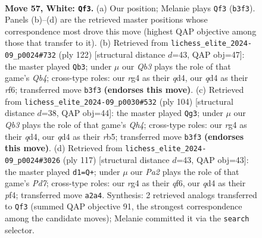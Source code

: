\documentclass[11pt]{article}
\begin{document}
\clearpage

\begin{figure}[p]\centering
\begin{subfigure}{0.46\textwidth}\centering
\resizebox{\linewidth}{!}{%
\newchessgame
\chessboard[
  setfen={8/8/5pk1/3p4/3q2r1/1Q4P1/P5KP/8 w - - 8 57},
  showmover=false,
  pgfstyle=straightmove, color=movearrow, markmove={b3-f3}
]}
\caption{}
\end{subfigure}\hfill
\begin{subfigure}{0.46\textwidth}\centering
\resizebox{\linewidth}{!}{%
\newchessgame
\chessboard[
  setfen={8/4R3/2p2r1k/8/1QPq3p/P7/KP6/8 w - - 4 62},
  showmover=false,
  pgfstyle=straightmove, color=movearrow, markmove={b4-b3}
]}
\caption{}
\end{subfigure}
\\[4pt]
\begin{subfigure}{0.46\textwidth}\centering
\resizebox{\linewidth}{!}{%
\newchessgame
\chessboard[
  setfen={8/3k1p2/5p2/1r6/3q1P1Q/Rp5P/6PK/8 w - - 2 53},
  showmover=false,
  pgfstyle=straightmove, color=movearrow, markmove={h4-g3}
]}
\caption{}
\end{subfigure}\hfill
\begin{subfigure}{0.46\textwidth}\centering
\resizebox{\linewidth}{!}{%
\newchessgame
\chessboard[
  setfen={8/6P1/3kpQ2/7K/5P2/1p6/1P1p4/4q3 b - - 2 59},
  showmover=false,
  pgfstyle=straightmove, color=movearrow, markmove={d2-d1}
]}
\caption{}
\end{subfigure}
\caption{\textbf{Move 57, White: \texttt{Qf3}.} (a) Our position; Melanie plays \texttt{Qf3} (\texttt{b3f3}). Panels (b)--(d) are the retrieved master positions whose correspondence most drove this move (highest QAP objective among those that transfer to it). (b) Retrieved from \texttt{lichess\_elite\_2024-09\_p0024\#732} (ply 122) [structural distance $d$=43, QAP obj=47]: the master played \texttt{Qb3}; under $\mu$ our \emph{Qb3} plays the role of that game's \emph{Qb4}; cross-type roles: our \emph{r}g4 as their \emph{q}d4, our \emph{q}d4 as their \emph{r}f6; transferred move \texttt{b3f3} \textbf{(endorses this move)}. (c) Retrieved from \texttt{lichess\_elite\_2024-09\_p0030\#532} (ply 104) [structural distance $d$=38, QAP obj=44]: the master played \texttt{Qg3}; under $\mu$ our \emph{Qb3} plays the role of that game's \emph{Qh4}; cross-type roles: our \emph{r}g4 as their \emph{q}d4, our \emph{q}d4 as their \emph{r}b5; transferred move \texttt{b3f3} \textbf{(endorses this move)}. (d) Retrieved from \texttt{lichess\_elite\_2024-09\_p0024\#3026} (ply 117) [structural distance $d$=43, QAP obj=43]: the master played \texttt{d1=Q+}; under $\mu$ our \emph{Pa2} plays the role of that game's \emph{Pd7}; cross-type roles: our \emph{r}g4 as their \emph{q}f6, our \emph{q}d4 as their \emph{p}f4; transferred move \texttt{a2a4}. Synthesis: 2 retrieved analogs transferred to \texttt{Qf3} (summed QAP objective 91, the strongest correspondence among the candidate moves); Melanie committed it via the \texttt{search} selector.}
\label{fig:thought-m112}
\end{figure}
\end{document}
